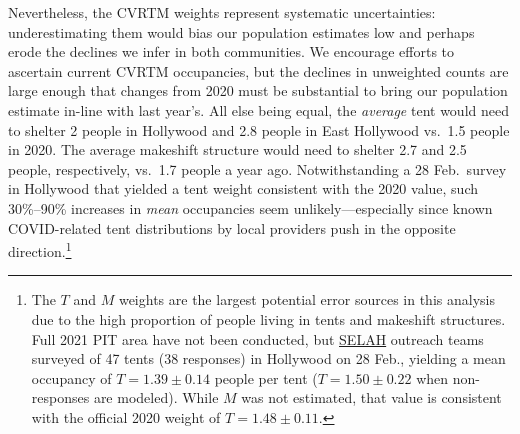 \documentclass[11pt]{article}
\def\resp{respectively}
\def\selah{SELAH}
\begin{document}
Nevertheless, the CVRTM weights represent systematic uncertainties: underestimating them would bias
our population estimates low and perhaps erode the declines we infer in both communities. We encourage
efforts to ascertain current CVRTM occupancies, but the declines in unweighted counts are large enough that 
changes from 2020 must be substantial to bring our population estimate in-line with last year's. All else being equal, 
the {\it average} tent would need to shelter 2 people in Hollywood and 2.8 people in East Hollywood vs.\ 1.5 people in 2020. 
The average makeshift structure would need to shelter 2.7 and 2.5 people, \resp, vs.\ 1.7 people a year ago. Notwithstanding
a 28 Feb.\ survey in Hollywood that yielded a tent weight consistent with the 2020 value, 
such 30\%--90\% increases in {\it mean} occupancies seem unlikely---especially since known COVID-related
tent distributions by local providers push in the opposite direction.\footnote{The $T$ and $M$ weights are the largest 
potential error sources in this analysis due to the high proportion of people living in tents and makeshift structures. 
Full 2021 PIT area have not been conducted, but \href{https://selahnch.org}{\selah} outreach teams surveyed of 47 
tents (38 responses) in Hollywood on 28 Feb., yielding a mean occupancy of $T=1.39\pm0.14$ people per tent 
($T=1.50\pm0.22$ when non-responses are modeled). While $M$ was not estimated, that value is consistent 
with the official 2020 weight of $T=1.48\pm0.11$.}
\end{document}
